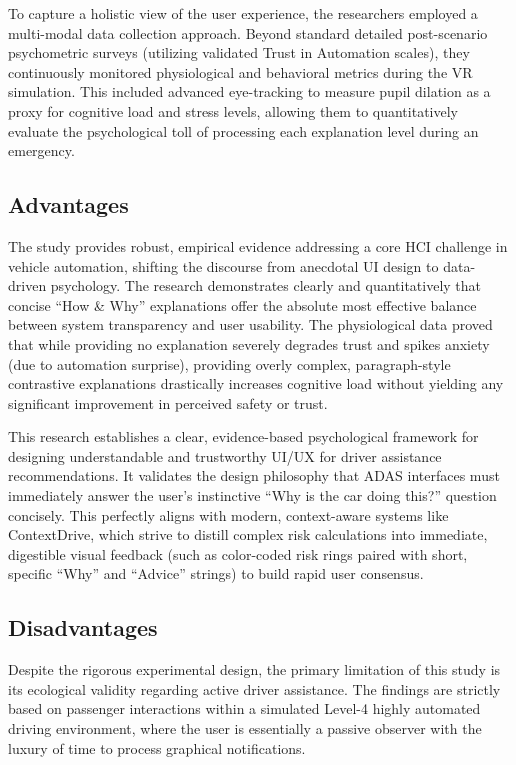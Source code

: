To capture a holistic view of the user experience, the researchers employed a multi-modal data collection approach. Beyond standard detailed post-scenario psychometric surveys (utilizing validated Trust in Automation scales), they continuously monitored physiological and behavioral metrics during the VR simulation. This included advanced eye-tracking to measure pupil dilation as a proxy for cognitive load and stress levels, allowing them to quantitatively evaluate the psychological toll of processing each explanation level during an emergency.

\subsection{Advantages}
The study provides robust, empirical evidence addressing a core HCI challenge in vehicle automation, shifting the discourse from anecdotal UI design to data-driven psychology. The research demonstrates clearly and quantitatively that concise ``How \& Why'' explanations offer the absolute most effective balance between system transparency and user usability. The physiological data proved that while providing no explanation severely degrades trust and spikes anxiety (due to automation surprise), providing overly complex, paragraph-style contrastive explanations drastically increases cognitive load without yielding any significant improvement in perceived safety or trust. 

This research establishes a clear, evidence-based psychological framework for designing understandable and trustworthy UI/UX for driver assistance recommendations. It validates the design philosophy that ADAS interfaces must immediately answer the user's instinctive ``Why is the car doing this?'' question concisely. This perfectly aligns with modern, context-aware systems like ContextDrive, which strive to distill complex risk calculations into immediate, digestible visual feedback (such as color-coded risk rings paired with short, specific ``Why'' and ``Advice'' strings) to build rapid user consensus.

\subsection{Disadvantages}
Despite the rigorous experimental design, the primary limitation of this study is its ecological validity regarding active driver assistance. The findings are strictly based on passenger interactions within a simulated Level-4 highly automated driving environment, where the user is essentially a passive observer with the luxury of time to process graphical notifications. 

